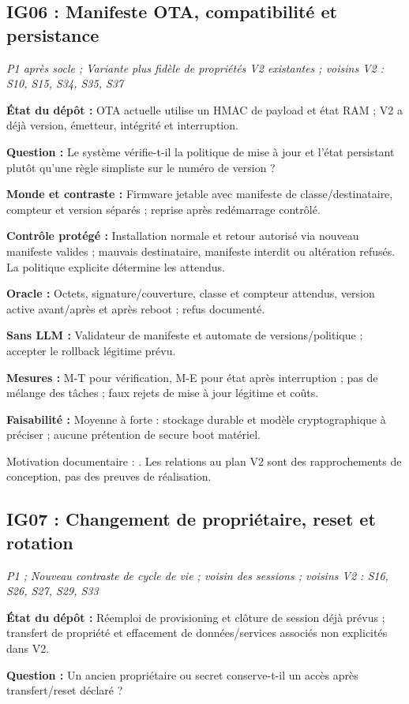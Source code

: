 \documentclass[11pt,a4paper]{article}
\begin{document}
\begin{samepage}\subsection{IG06 : Manifeste OTA, compatibilité et persistance}
\textit{P1 après socle ; Variante plus fidèle de propriétés V2 existantes ; voisins V2 : S10, S15, S34, S35, S37}

\textbf{État du dépôt :} OTA actuelle utilise un HMAC de payload et état RAM ; V2 a déjà version, émetteur, intégrité et interruption.
\par\end{samepage}
\textbf{Question :} Le système vérifie-t-il la politique de mise à jour et l'état persistant plutôt qu'une règle simpliste sur le numéro de version ?

\textbf{Monde et contraste :} Firmware jetable avec manifeste de classe/destinataire, compteur et version séparés ; reprise après redémarrage contrôlé.

\textbf{Contrôle protégé :} Installation normale et retour autorisé via nouveau manifeste valides ; mauvais destinataire, manifeste interdit ou altération refusés. La politique explicite détermine les attendus.

\textbf{Oracle :} Octets, signature/couverture, classe et compteur attendus, version active avant/après et après reboot ; refus documenté.

\textbf{Sans LLM :} Validateur de manifeste et automate de versions/politique ; accepter le rollback légitime prévu.

\textbf{Mesures :} M-T pour vérification, M-E pour état après interruption ; pas de mélange des tâches ; faux rejets de mise à jour légitime et coûts.

\textbf{Faisabilité :} Moyenne à forte : stockage durable et modèle cryptographique à préciser ; aucune prétention de secure boot matériel.

Motivation documentaire : \cite{manifest,etsi}. Les relations au plan V2 sont des rapprochements de conception, pas des preuves de réalisation.

\begin{samepage}\subsection{IG07 : Changement de propriétaire, reset et rotation}
\textit{P1 ; Nouveau contraste de cycle de vie ; voisin des sessions ; voisins V2 : S16, S26, S27, S29, S33}

\textbf{État du dépôt :} Réemploi de provisioning et clôture de session déjà prévus ; transfert de propriété et effacement de données/services associés non explicités dans V2.
\par\end{samepage}
\textbf{Question :} Un ancien propriétaire ou secret conserve-t-il un accès après transfert/reset déclaré ?
\end{document}
